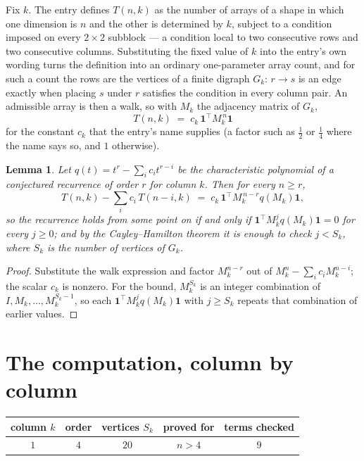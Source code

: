 \documentclass[11pt,a4paper]{article}
\theoremstyle{plain}
\newtheorem{lemma}[theorem]{Lemma}
\theoremstyle{definition}
\begin{document}
Fix $k$. The entry defines $T(n,k)$ as the number of arrays of a shape in which one dimension
is $n$ and the other is determined by $k$, subject to a condition imposed on every
$2\times2$ subblock --- a condition local to two consecutive rows and two consecutive columns.
Substituting the fixed value of $k$ into the entry's own wording turns the definition into an
ordinary one-parameter array count, and for such a count the rows are the vertices of a finite
digraph $G_k$: $r\to s$ is an edge exactly when placing $s$ under $r$ satisfies the condition
in every column pair. An admissible array is then a walk, so with $M_k$ the adjacency matrix
of $G_k$,
\[
T(n,k)\;=\;c_k\,\mathbf{1}^{\!\top}M_k^{\,n}\mathbf{1}
\]
for the constant $c_k$ that the entry's name supplies (a factor such as $\tfrac12$ or
$\tfrac14$ where the name says so, and $1$ otherwise).

\begin{lemma}\label{lem:crit}
Let $q(t)=t^{r}-\sum_i c_it^{r-i}$ be the characteristic polynomial of a conjectured
recurrence of order $r$ for column $k$. Then for every $n\ge r$,
\[
T(n,k)-\sum_i c_i\,T(n-i,k)\;=\;c_k\,\mathbf{1}^{\!\top}M_k^{\,n-r}q(M_k)\mathbf{1},
\]
so the recurrence holds from some point on if and only if
$\mathbf{1}^{\!\top}M_k^{j}q(M_k)\mathbf{1}=0$ for every $j\ge0$; and by the
Cayley--Hamilton theorem it is enough to check $j<S_k$, where $S_k$ is the number of vertices
of $G_k$.
\end{lemma}

\begin{proof}
Substitute the walk expression and factor $M_k^{n-r}$ out of $M_k^{n}-\sum_ic_iM_k^{n-i}$;
the scalar $c_k$ is nonzero. For the bound, $M_k^{S_k}$ is an integer combination of
$I,M_k,\dots,M_k^{S_k-1}$, so each $\mathbf{1}^{\!\top}M_k^{j}q(M_k)\mathbf{1}$ with
$j\ge S_k$ repeats that combination of earlier values.
\end{proof}

\section{The computation, column by column}

\begin{center}
\begin{tabular}{ccccc}
column $k$ & order & vertices $S_k$ & proved for & terms checked \\ \hline
$1$ & $4$ & $20$ & $n>4$ & $9$ \\
\end{tabular}
\end{center}
\end{document}
